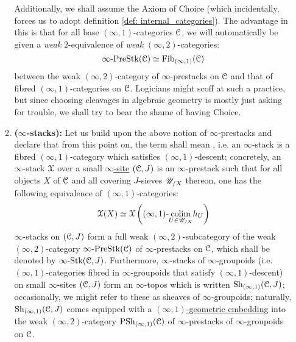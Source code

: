 \begin{convention}
\begin{enumerate}
\begin{enumerate}
                            Additionally, we shall assume the Axiom of Choice (which incidentally, forces us to adopt definition \ref{def: internal_categories}). The advantage in this is that for all base $(\infty, 1)$-categories $\mathcal{C}$, we will automatically be given a \textit{weak} $2$-equivalence of \textit{weak} $(\infty, 2)$-categories:
                                $$\infty\text{-}\mathrm{Pre}\mathrm{Stk}(\mathcal{C}) \simeq \mathrm{Fib}_{(\infty, 1)}(\mathcal{C})$$
                            between the weak $(\infty, 2)$-category of $\infty$-prestacks on $\mathcal{C}$ and that of fibred $(\infty, 1)$-categories on $\mathcal{C}$. Logicians might scoff at such a practice, but since choosing cleavages in algebraic geometry is mostly just asking for trouble, we shall try to bear the shame of having Choice.
                            \item \textbf{($\infty$-stacks):} Let us build upon the above notion of $\infty$-prestacks and declare that from this point on, the term  shall mean , i.e. an $\infty$-stack is a fibred $(\infty, 1)$-category which satisfies $(\infty, 1)$-descent; concretely, an $\infty$-stack $\mathcal{X}$ over a small \href{https://ncatlab.org/nlab/show/(infinity,1)-site}{\underline{$\infty$-site}} $(\mathcal{C}, J)$ is an $\infty$-prestack such that for all objects $X$ of $\mathcal{C}$ and all covering $J$-sieves $\mathscr{U}_{/X}$ thereon, one has the following equivalence of $(\infty, 1)$-categories:
                                $$\mathcal{X}(X) \simeq \mathcal{X}\left((\infty, 1)\text{-}\underset{U \in \mathscr{U}_{/X}}{\operatorname{colim}} h_U\right)$$
                            $\infty$-stacks on $(\mathcal{C}, J)$ form a full weak $(\infty, 2)$-subcategory of the weak $(\infty, 2)$-category $\infty\text{-}\mathrm{Pre}\mathrm{Stk}(\mathcal{C})$ of $\infty$-prestacks on $\mathcal{C}$, which shall be denoted by $\infty\text{-}\mathrm{Stk}(\mathcal{C}, J)$. Furthermore, $\infty$-stacks of $\infty$-groupoids (i.e. $(\infty, 1)$-categories fibred in $\infty$-groupoids that satisfy $(\infty, 1)$-descent) on small $\infty$-sites $(\mathcal{C}, J)$ form an $\infty$-topos which is written $\mathrm{Sh}_{(\infty, 1)}(\mathcal{C}, J)$; occasionally, we might refer to these as sheaves of $\infty$-groupoids; naturally, $\mathrm{Sh}_{(\infty, 1)}(\mathcal{C}, J)$ comes equipped with a \href{https://ncatlab.org/nlab/show/(infinity,1)-topos#AsAGeometricEmbedding}{\underline{$(\infty, 1)$-geometric embedding}} into the weak $(\infty, 2)$-category $\mathrm{PSh}_{(\infty, 1)}(\mathcal{C})$ of $\infty$-prestacks of $\infty$-groupoids on $\mathcal{C}$.
                        \end{enumerate}

\end{enumerate}
\end{convention}
